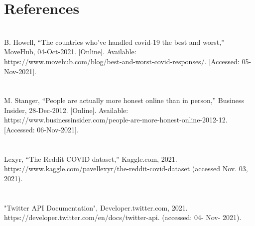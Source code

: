 \documentclass[fontsize=11pt]{article}
\begin{document}
\section*{References}

\text{[1]}
\\
B. Howell, “The countries who've handled covid-19 the best and worst,” MoveHub, 04-Oct-2021. [Online]. Available: https://www.movehub.com/blog/best-and-worst-covid-responses/. [Accessed: 05-Nov-2021]. 
\\\\
\text{[2]}
\\
M. Stanger, “People are actually more honest online than in person,” Business Insider, 28-Dec-2012. [Online]. Available: https://www.businessinsider.com/people-are-more-honest-online-2012-12. [Accessed: 06-Nov-2021]. 
\\\\
\text{[3]}
\\
Lexyr, “The Reddit COVID dataset,” Kaggle.com, 2021. https://www.kaggle.com/pavellexyr/the-reddit-covid-dataset (accessed Nov. 03, 2021).
\\\\
\text{[4]}
\\
 "Twitter API Documentation", Developer.twitter.com, 2021.
https://developer.twitter.com/en/docs/twitter-api. (accessed: 04- Nov- 2021).


\end{document}
